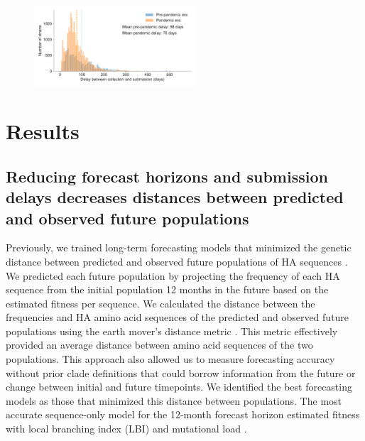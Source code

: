 \documentclass[9pt,lineno]{elife}
\begin{document}
\begin{figure}[htb!]
{}\label{fig:model_of_delays_and_horizons}
%
{\includegraphics[width=6cm]{figures/distribution_of_delays_by_pandemic_era}}\label{figsupp:distribution_of_delays_by_pandemic_era}
\end{figure}

\section{Results}

\subsection{Reducing forecast horizons and submission delays decreases distances between predicted and observed future populations}

Previously, we trained long-term forecasting models that minimized the genetic distance between predicted and observed future populations of HA sequences \citep{Huddleston2020}.
We predicted each future population by projecting the frequency of each HA sequence from the initial population 12 months in the future based on the estimated fitness per sequence.
We calculated the distance between the frequencies and HA amino acid sequences of the predicted and observed future populations using the earth mover's distance metric \citep{Rubner1998}.
This metric effectively provided an average distance between amino acid sequences of the two populations.
This approach also allowed us to measure forecasting accuracy without prior clade definitions that could borrow information from the future or change between initial and future timepoints.
We identified the best forecasting models as those that minimized this distance between populations.
The most accurate sequence-only model for the 12-month forecast horizon estimated fitness with local branching index (LBI) \citep{Neher:2014eu} and mutational load \citep{Luksza:2014hj}.
\end{document}
